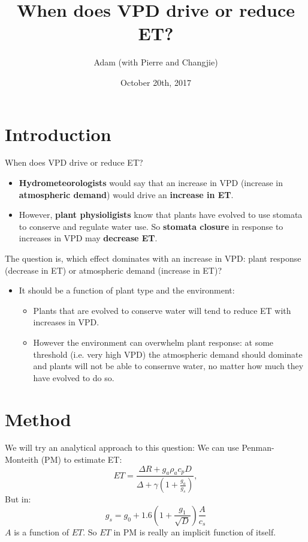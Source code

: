 \documentclass{beamer}
\title[Your Short Title]{When does VPD drive or reduce ET?}
\author{Adam (with Pierre and Changjie)}
\institute{G-Lab Meeting}
\date{October 20th, 2017}
\begin{document}
\begin{frame}
  \titlepage
\end{frame}

\section{Introduction}
\begin{frame}{When does VPD drive or reduce ET?}
  \begin{itemize}
  \item \textbf{Hydrometeorologists} would say that an increase in VPD (increase in \textbf{atmospheric demand}) would drive an \textbf{increase in ET}.
  \item However, \textbf{plant physioligists} know that plants have evolved to use stomata to conserve and regulate water use. So \textbf{stomata closure} in response to increases in VPD may \textbf{decrease ET}.
  \end{itemize}
\end{frame}

\begin{frame}{The question is, which effect dominates with an increase in VPD: plant response (decrease in ET) or atmospheric demand (increase in ET)?}
  \begin{itemize}
  \item It should be a function of plant type and the environment:
    \begin{itemize}
    \item Plants that are evolved to conserve water will tend to reduce ET with increases in VPD.
    \item However the environment can overwhelm plant response: at some threshold (i.e. very high VPD) the atmospheric demand should dominate and plants will not be able to consernve water, no matter how much they have evolved to do so.
    \end{itemize}
  \end{itemize}
\end{frame}

\section{Method}
\begin{frame}{We will try an analytical approach to this question:}
  We can use Penman-Monteith (PM) to estimate ET:
  \[ET = \frac{\Delta R + g_a \rho_a c_p D}{\Delta + \gamma(1 + \frac{g_a}{g_s})},\]
  But in:
  \[  g_{s} = g_0 + 1.6 \left(1 + \frac{g_1}{\sqrt{D}}\right) \frac{A}{c_s}\]
  $A$ is a function of $ET$. So $ET$ in PM is really an implicit function of itself.
\end{frame}
\end{document}
